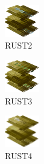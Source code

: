 \hspace{0.1cm}
\begin{minipage}[b]{0.15\linewidth}
\begin{figure}[H]                                                          
  \centering                                                             
  \begin{adjustbox}{width=1.5cm,center}                                   
  \includegraphics[width=1.5cm]{src/colorspace_colourflow/flows/colourflow_18-45.png}%
  \end{adjustbox}                                                        
\caption*{RUST2}                                           
\end{figure}                                                               
\end{minipage}
\hspace{0.1cm}
\begin{minipage}[b]{0.15\linewidth}
\begin{figure}[H]                                                          
  \centering                                                             
  \begin{adjustbox}{width=1.5cm,center}                                   
  \includegraphics[width=1.5cm]{src/colorspace_colourflow/flows/colourflow_19-45.png}%
  \end{adjustbox}                                                        
\caption*{RUST3}                                           
\end{figure}                                                               
\end{minipage}
\hspace{0.1cm}
\begin{minipage}[b]{0.15\linewidth}
\begin{figure}[H]                                                          
  \centering                                                             
  \begin{adjustbox}{width=1.5cm,center}                                   
  \includegraphics[width=1.5cm]{src/colorspace_colourflow/flows/colourflow_20-45.png}%
  \end{adjustbox}                                                        
\caption*{RUST4}                                           
\end{figure}                                                               
\end{minipage}
